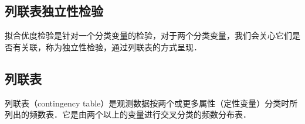 \subsection{列联表独立性检验}
拟合优度检验是针对一个分类变量的检验，对于两个分类变量，我们会关心它们是否有关联，称为独立性检验，通过列联表的方式呈现．
\subsection{列联表}
列联表（contingency table）是观测数据按两个或更多属性（定性变量）分类时所列出的频数表．它是由两个以上的变量进行交叉分类的频数分布表．